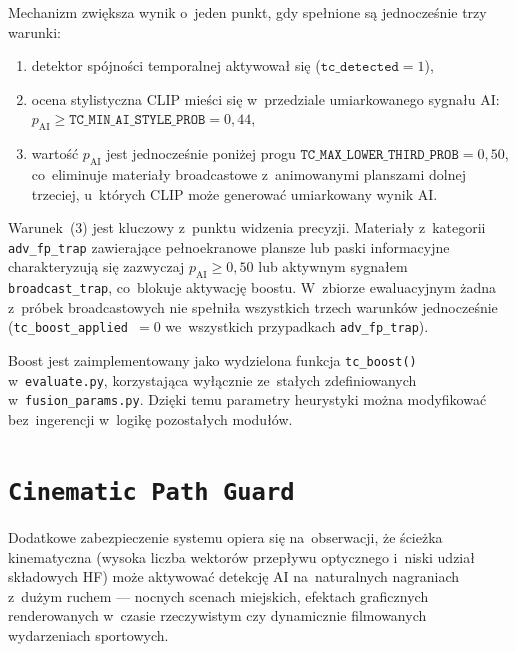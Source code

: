 Mechanizm zwiększa wynik o~jeden punkt, gdy spełnione są jednocześnie
trzy warunki:
\begin{enumerate}
  \item detektor spójności temporalnej aktywował się ($\texttt{tc\_detected} = 1$),
  \item ocena stylistyczna CLIP mieści się w~przedziale umiarkowanego
    sygnału AI: $p_\text{AI} \geq \texttt{TC\_MIN\_AI\_STYLE\_PROB} = 0{,}44$,
  \item wartość $p_\text{AI}$ jest jednocześnie poniżej progu
    $\texttt{TC\_MAX\_LOWER\_THIRD\_PROB} = 0{,}50$,
    co~eliminuje materiały broadcastowe z~animowanymi planszami dolnej trzeciej,
    u~których CLIP może generować umiarkowany wynik AI.
\end{enumerate}

Warunek~(3) jest kluczowy z~punktu widzenia precyzji. Materiały z~kategorii
\texttt{adv\_fp\_trap} zawierające pełnoekranowe plansze lub paski informacyjne
charakteryzują się zazwyczaj $p_\text{AI} \geq 0{,}50$ lub aktywnym sygnałem
\texttt{broadcast\_trap}, co~blokuje aktywację boostu. W~zbiorze ewaluacyjnym
żadna z~próbek broadcastowych nie spełniła wszystkich trzech warunków
jednocześnie (\texttt{tc\_boost\_applied}~$= 0$ we~wszystkich przypadkach
\texttt{adv\_fp\_trap}).

Boost jest zaimplementowany jako wydzielona funkcja \texttt{tc\_boost()}
w~\texttt{evaluate.py}, korzystająca wyłącznie ze~stałych zdefiniowanych
w~\texttt{fusion\_params.py}. Dzięki temu parametry heurystyki można
modyfikować bez~ingerencji w~logikę pozostałych modułów.

\section{\texttt{Cinematic Path Guard}}
\label{sec:cinematic_guard}

Dodatkowe zabezpieczenie systemu opiera się na~obserwacji, że
ścieżka kinematyczna (wysoka liczba wektorów przepływu optycznego
i~niski udział składowych HF) może aktywować detekcję AI
na~naturalnych nagraniach z~dużym ruchem --- nocnych scenach miejskich,
efektach graficznych renderowanych w~czasie rzeczywistym czy dynamicznie
filmowanych wydarzeniach sportowych.

